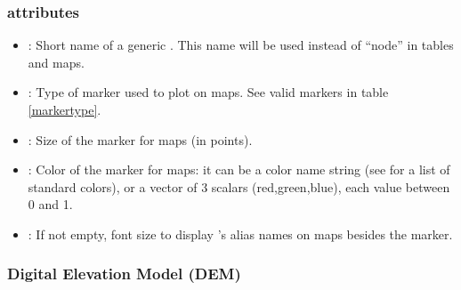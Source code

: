 \subsubsection{ attributes}
\begin{itemize}

\item {}: Short name of a generic . This name will be used instead of ``node'' in tables and maps.

\item {}: Type of marker used to plot  on maps. See valid markers in table \ref{markertype}.

\item {}: Size of the  marker for maps (in points).

\item {}: Color of the  marker for maps: it can be a color name string (see  for a list of standard colors), or a vector of 3 scalars (red,green,blue), each value between 0 and 1.

\item {}: If not empty, font size to display 's alias names on maps besides the marker.

\end{itemize}

\subsubsection{Digital Elevation Model (DEM)}


